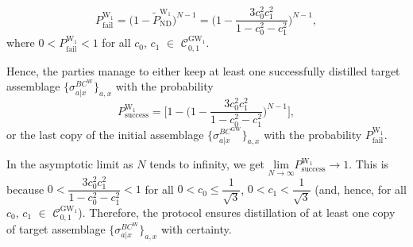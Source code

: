 \documentclass[reprint,superscriptaddress,nofootinbib,amsmath,amssymb,aps,pra,longbibliography]{revtex4-1}
\begin{document}
\begin{equation}
    P^{\text{W}_1}_{\text{fail}} = \Big(1-\tilde{P}^{\text{W}_1}_{\text{ND}}\Big)^{N-1} = \Bigg(1-\dfrac{3 c_0^2 c_1^2}{ 1-c_0^2-c_1^2}\Bigg)^{N-1},
    \label{failurew1sdi}
\end{equation}
where $0 < P^{\text{W}_1}_{\text{fail}} < 1$ for all $c_0$, $c_1$ $\in$ $\mathcal{C}^{\text{GW}_1}_{0,1}$. 

Hence, the parties manage to either keep at least one successfully distilled target assemblage $\{\sigma_{a|x}^{BC^{\text{W}}}\}_{a,x}$ with the probability 
\begin{equation}
   P^{\text{W}_1}_{\text{success}} = \Bigg[1-\Bigg(1-\dfrac{3 c_0^2 c_1^2}{ 1-c_0^2-c_1^2}\Bigg)^{N-1}\Bigg], 
\end{equation} 
or the last copy of the initial assemblage $\{\sigma_{a|x}^{BC^{\text{GW}}}\}_{a,x}$ with the probability $P^{\text{W}_1}_{\text{fail}}$.

In the asymptotic limit as $N$ tends to infinity, we get $\underset{N \rightarrow \infty}{\text{lim}} P^{\text{W}_1}_{\text{success}} \rightarrow 1$. This is because $0 < \dfrac{3 c_0^2 c_1^2}{ 1-c_0^2-c_1^2} < 1$ for all $0 < c_0 \leq \dfrac{1}{\sqrt{3}}$, $0 < c_1 < \dfrac{1}{\sqrt{3}}$ (and, hence, for all $c_0$, $c_1$ $\in$ $\mathcal{C}^{\text{GW}_1}_{0,1}$). Therefore, the protocol ensures distillation of at least one copy of target assemblage $\{\sigma_{a|x}^{BC^{\text{W}}}\}_{a,x}$ with certainty.
\end{document}
